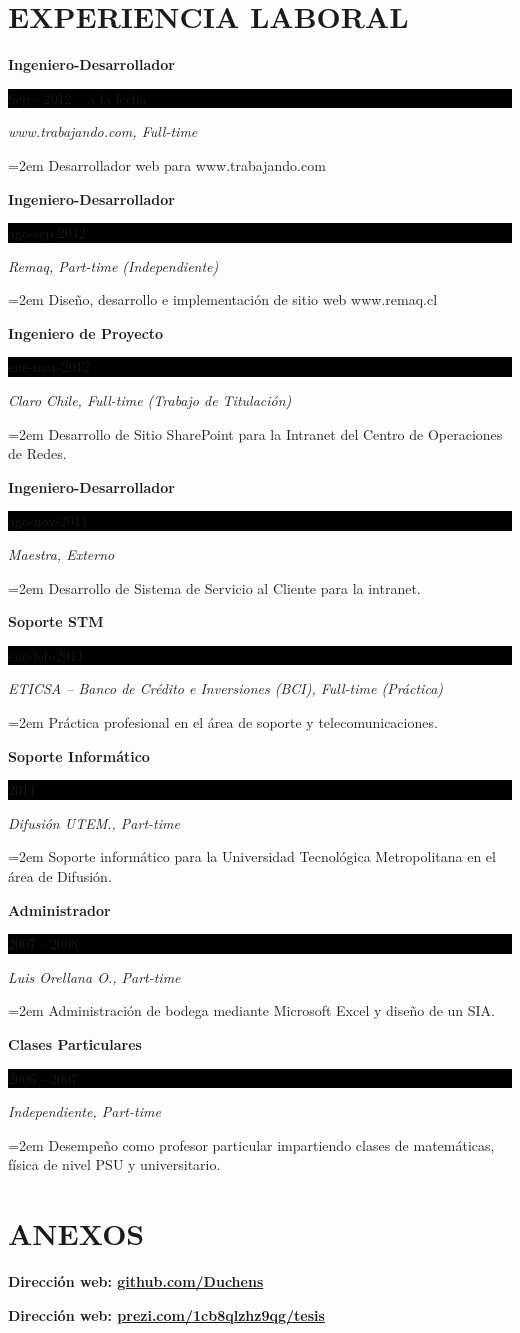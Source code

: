 \documentclass[paper=a4,fontsize=11pt]{scrartcl}	 			%
\newcommand{\sepspace}{\vspace*{1em}}			%
\newcommand{\NewPart}[1]{\section*{\uppercase{#1}}}
\newcommand{\EducationEntry}[4]{
		\noindent \textbf{#1} \hfill 					%
		\colorbox{Black}{%
			\parbox{6em}{%
			\hfill\color{White}#2}} \par				%
		\noindent \textit{#3} \par					%
		\noindent\hangindent=2em\hangafter=0 \small #4 	%
		\normalsize \par}
\begin{document}
\NewPart{Experiencia Laboral}{}

\EducationEntry{Ingeniero-Desarrollador}{Sep - 2012 -- a la fecha}{www.trabajando.com,  Full-time}{Desarrollador web para  www.trabajando.com}

\sepspace

\EducationEntry{Ingeniero-Desarrollador}{ago-sep-2012}{Remaq,  Part-time (Independiente)}{Diseño, desarrollo e implementación de sitio web www.remaq.cl}

\sepspace

\EducationEntry{Ingeniero de Proyecto}{ene-mar-2012}{Claro Chile,  Full-time (Trabajo de Titulación)}{Desarrollo de Sitio SharePoint para la Intranet del Centro de Operaciones de Redes.}

\sepspace

\EducationEntry{Ingeniero-Desarrollador}{ago-nov-2011}{Maestra, Externo}{Desarrollo de Sistema de Servicio al Cliente para la intranet.}

\sepspace

\EducationEntry{Soporte STM}{ene-feb-2011}{ETICSA – Banco de Crédito e Inversiones (BCI), Full-time (Práctica)}{Práctica profesional en el área de soporte y telecomunicaciones.}

 
\sepspace

\EducationEntry{Soporte Informático}{2011}{Difusión UTEM., Part-time}{Soporte informático para la Universidad Tecnológica Metropolitana en el área de Difusión.}

\sepspace

\EducationEntry{Administrador}{2007 - 2008}{Luis Orellana O., Part-time}{Administración de bodega mediante Microsoft Excel y diseño de un SIA.}


\sepspace

\EducationEntry{Clases Particulares}{2006 - 2007}{Independiente, Part-time}{Desempeño como profesor particular impartiendo  clases de matemáticas, física de nivel PSU y universitario. }



\NewPart{Anexos}{}
\textbf{Dirección web: \hspace{0.6cm}   \url{github.com/Duchens}}

\sepspace

\textbf{Dirección web:  \hspace{0.6cm}  \url{prezi.com/1cb8qlzhz9qg/tesis}}
\end{document}
